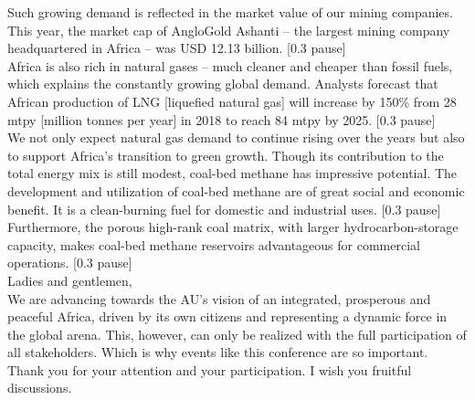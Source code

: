 Such growing demand is reflected in the market value of our mining companies. This year, the market cap of AngloGold Ashanti – the largest mining company headquartered in Africa – was USD 12.13 billion. [0.3 pause]\\

Africa is also rich in natural gases – much cleaner and cheaper than fossil fuels, which explains the constantly growing global demand. Analysts forecast that African production of LNG [liquefied natural gas] will increase by 150\% from 28 mtpy [million tonnes per year] in 2018 to reach 84 mtpy by 2025. [0.3 pause] \\

We not only expect natural gas demand to continue rising over the years but also to support Africa’s transition to green growth. Though its contribution to the total energy mix is still modest, coal-bed methane has impressive potential. The development and utilization of coal-bed methane are of great social and economic benefit. It is a clean-burning fuel for domestic and industrial uses. [0.3 pause] \\

Furthermore, the porous high-rank coal matrix, with larger hy\-dro\-car\-bon-stor\-age capacity, makes coal-bed methane reservoirs advantageous for commercial operations. [0.3 pause] \\

\noindent Ladies and gentlemen, \\
We are advancing towards the AU’s vision of an integrated, prosperous and peaceful Africa, driven by its own citizens and representing a dynamic force in the global arena. This, however, can only be realized with the full participation of all stakeholders. Which is why events like this conference are so important. 
Thank you for your attention and your participation. I wish you fruitful discussions.


